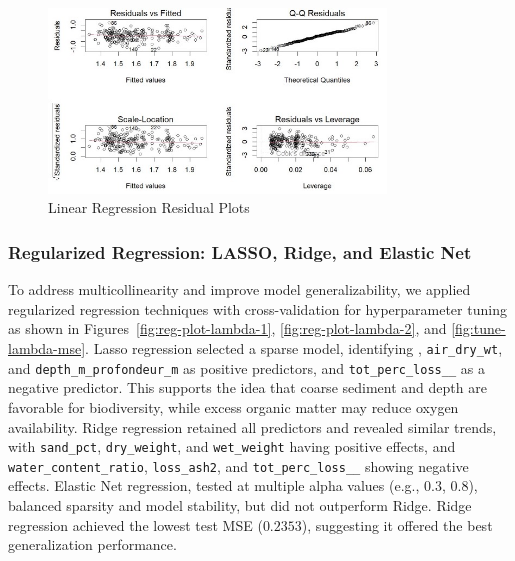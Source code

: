 \documentclass[12pt]{article}
\begin{document}
\begin{figure}[H]
\centering
\includegraphics[width=0.8\textwidth]{linear-regression-residual-plots.jpg}
\caption{Linear Regression Residual Plots}
\label{fig:residual-plots}
\end{figure}


\subsubsection{Regularized Regression: LASSO, Ridge, and Elastic Net}

\qquad To address multicollinearity and improve model generalizability, we
applied regularized regression techniques with cross-validation for
hyperparameter tuning as shown in Figures~\ref{fig:reg-plot-lambda-1},
\ref{fig:reg-plot-lambda-2}, and \ref{fig:tune-lambda-mse}. Lasso regression
selected a sparse model, identifying , \texttt{air\_dry\_wt},
and \texttt{depth\_m\_profondeur\_m} as positive predictors, and
\texttt{tot\_perc\_loss\_\_} as a negative predictor. This supports the idea
that coarse sediment and depth are favorable for biodiversity, while excess
organic matter may reduce oxygen availability. Ridge regression retained all
predictors and revealed similar trends, with \texttt{sand\_pct},
\texttt{dry\_weight}, and \texttt{wet\_weight} having positive effects, and
\texttt{water\_content\_ratio}, \texttt{loss\_ash2}, and
\texttt{tot\_perc\_loss\_\_} showing negative effects. Elastic Net regression,
tested at multiple alpha values (e.g., $0.3$, $0.8$), balanced sparsity and
model stability, but did not outperform Ridge. Ridge regression achieved the
lowest test MSE ($0.2353$), suggesting it offered the best generalization
performance.
\end{document}
